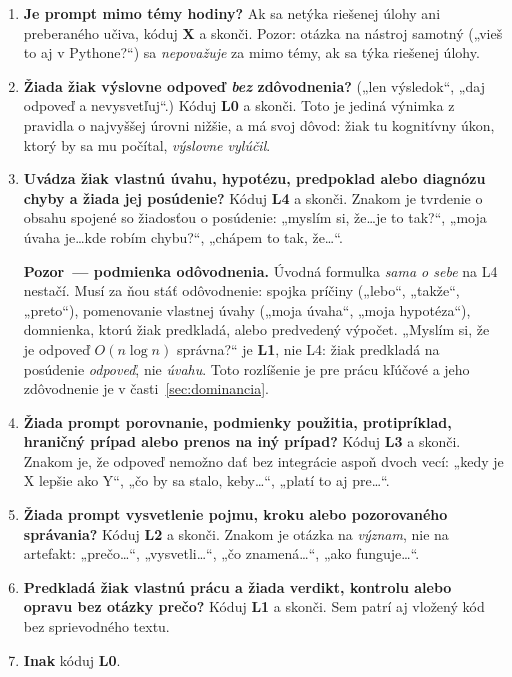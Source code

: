 \begin{enumerate}[nosep]
    \item \textbf{Je prompt mimo témy hodiny?} Ak sa netýka riešenej úlohy ani preberaného učiva, kóduj \textbf{X} a skonči. Pozor: otázka na nástroj samotný („vieš to aj v Pythone?“) sa \emph{nepovažuje} za mimo témy, ak sa týka riešenej úlohy.
    \item \textbf{Žiada žiak výslovne odpoveď \emph{bez} zdôvodnenia?} („len výsledok“, „daj odpoveď a nevysvetľuj“.) Kóduj \textbf{L0} a skonči. Toto je jediná výnimka z pravidla o najvyššej úrovni nižšie, a má svoj dôvod: žiak tu kognitívny úkon, ktorý by sa mu počítal, \emph{výslovne vylúčil}.
    \item \textbf{Uvádza žiak vlastnú úvahu, hypotézu, predpoklad alebo diagnózu chyby a žiada jej posúdenie?} Kóduj \textbf{L4} a skonči. Znakom je tvrdenie o obsahu spojené so žiadosťou o posúdenie: „myslím si, že\ldots je to tak?“, „moja úvaha je\ldots kde robím chybu?“, „chápem to tak, že\ldots“.

    \textbf{Pozor~--- podmienka odôvodnenia.} Úvodná formulka \emph{sama o sebe} na L4 nestačí. Musí za ňou stáť odôvodnenie: spojka príčiny („lebo“, „takže“, „preto“), pomenovanie vlastnej úvahy („moja úvaha“, „moja hypotéza“), domnienka, ktorú žiak predkladá, alebo predvedený výpočet. „Myslím si, že je odpoveď $O(n\log n)$ správna?“ je \textbf{L1}, nie L4: žiak predkladá na posúdenie \emph{odpoveď}, nie \emph{úvahu}. Toto rozlíšenie je pre prácu kľúčové a jeho zdôvodnenie je v časti~\ref{sec:dominancia}.
    \item \textbf{Žiada prompt porovnanie, podmienky použitia, protipríklad, hraničný prípad alebo prenos na iný prípad?} Kóduj \textbf{L3} a skonči. Znakom je, že odpoveď nemožno dať bez integrácie aspoň dvoch vecí: „kedy je X lepšie ako Y“, „čo by sa stalo, keby\ldots“, „platí to aj pre\ldots“.
    \item \textbf{Žiada prompt vysvetlenie pojmu, kroku alebo pozorovaného správania?} Kóduj \textbf{L2} a skonči. Znakom je otázka na \emph{význam}, nie na artefakt: „prečo\ldots“, „vysvetli\ldots“, „čo znamená\ldots“, „ako funguje\ldots“.
    \item \textbf{Predkladá žiak vlastnú prácu a žiada verdikt, kontrolu alebo opravu bez otázky prečo?} Kóduj \textbf{L1} a skonči. Sem patrí aj vložený kód bez sprievodného textu.
    \item \textbf{Inak} kóduj \textbf{L0}.
\end{enumerate}

